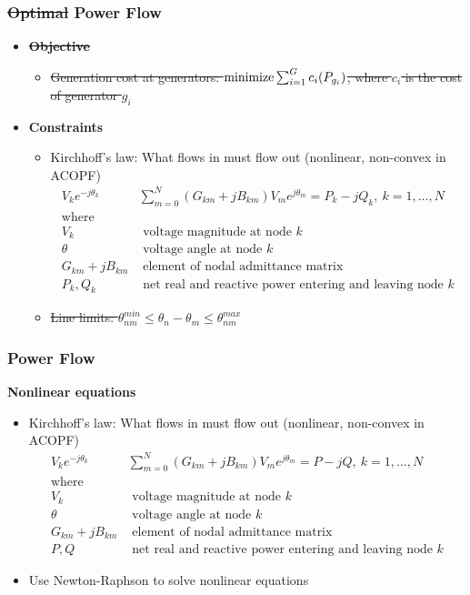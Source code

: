 \begin{frame}[fragile]
  \frametitle{\sout{Optimal} Power Flow}
  \begin{itemize}
    \item {\bf \sout{Objective}}
    \begin{itemize}
      \item \sout{Generation cost at generators:
      $ \minimize \sum^G_{i=1} c_i(P_{g_i})$, where $c_i$ is the cost of generator $g_i$}
    \end{itemize}
    \item {\bf Constraints}
    \begin{itemize}
      \item Kirchhoff's law: What flows in must flow out (nonlinear, non-convex in ACOPF)
      \begin{align*}
        V_k e^{-j\theta_k} & \sum^{N}_{m=0} (G_{km} + jB_{km})V_m e^{j\theta_m} = P_k - j Q_k,\ k = 1, \dots, N \\
        \text{where}\\
        V_k &\text{ voltage magnitude at node } k\\
        \theta &\text{ voltage angle at node } k\\
        G_{km} + jB_{km}& \text{ element of nodal admittance matrix}\\
        P_k , Q_k &\text{ net real and reactive power entering and leaving node } k
      \end{align*}
      \item \sout{Line limits: $ \theta^{min}_{nm} \leq \theta_n - \theta_m \leq \theta^{max}_{nm}$}
    \end{itemize}
  \end{itemize}
\end{frame}

\begin{frame}[fragile]
  \frametitle{Power Flow}
  {\bf Nonlinear equations}
  \begin{itemize}
      \item Kirchhoff's law: What flows in must flow out (nonlinear, non-convex in ACOPF)
      \begin{align*}
        V_k e^{-j\theta_k} & \sum^{N}_{m=0} (G_{km} + jB_{km})V_m e^{j\theta_m} = P - jQ,\ k = 1, \dots, N \\
        \text{where}\\
        V_k &\text{ voltage magnitude at node } k\\
        \theta &\text{ voltage angle at node } k\\
        G_{km} + jB_{km}& \text{ element of nodal admittance matrix}\\
        P, Q &\text{ net real and reactive power entering and leaving node } k
      \end{align*}
      \item Use Newton-Raphson to solve nonlinear equations
  \end{itemize}
\end{frame}

